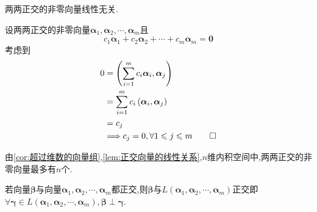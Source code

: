 \begin{green}
    \begin{lemma}[正交向量的线性关系]\label{lem:正交向量的线性关系}
        两两正交的非零向量线性无关.
    \end{lemma}
    \begin{Proof}
        设两两正交的非零向量$\bm{\alpha}_1,\bm{\alpha}_2,\cdots,\bm{\alpha}_m$且\[
        c_1\bm{\alpha}_1+c_2\bm{\alpha}_2+\cdots+c_m\bm{\alpha}_m=\bm{0}
        \]
        考虑到\begin{align*}
            0&=\left(
                \sum_{i=1}^{m}c_i\bm{\alpha}_i,\bm{\alpha}_j
            \right)\\
            &=\sum_{i=1}^{m}c_i\left(
                \bm{\alpha}_i,\bm{\alpha}_j
            \right)\\
            &=c_j\\
            &\Longrightarrow c_j=0,\forall 1\leqslant j\leqslant m\qedhere
        \end{align*}
    \end{Proof}
\end{green}
\begin{green}
    \begin{corollary}[正交向量个数]\label{cor:正交向量个数}
        由\cref{cor:超过维数的向量组},\cref{lem:正交向量的线性关系},$n$维内积空间中,两两正交的非零向量最多有$n$个.
    \end{corollary}
\end{green}
\begin{green}
    \begin{lemma}[与生成空间正交]\label{lem:与生成空间正交}
        若向量$\bm{\beta}$与向量$\bm{\alpha}_1,\bm{\alpha}_2,\cdots,\bm{\alpha}_m$都正交,则$\bm{\beta}$与$L\left(
            \bm{\alpha}_1,\bm{\alpha}_2,\cdots,\bm{\alpha}_m
        \right)$正交即$\forall\bm{\gamma}\in L\left(
            \bm{\alpha}_1,\bm{\alpha}_2,\cdots,\bm{\alpha}_m
        \right),\bm{\beta}\perp\bm{\gamma}.$
    \end{lemma}
\end{green}
